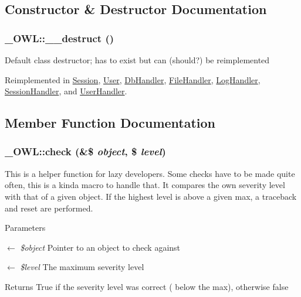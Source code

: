 \subsection{Constructor \& Destructor Documentation}
\subsubsection[{\_\-\_\-destruct}]{\setlength{\rightskip}{0pt plus 5cm}\_\-OWL::\_\-\_\-destruct ()}\label{class__OWL_a44fd2222476a3109286cc82d92b6bbcc}
Default class destructor; has to exist but can (should?) be reimplemented 

Reimplemented in \hyperlink{classSession_aa498272c85524e4700abc3363883165b}{Session}, \hyperlink{classUser_accd20149a7414612c1505e022eb63ffc}{User}, \hyperlink{classDbHandler_a7cd6bd727d1f296eb5dbfae6ca36ab3f}{DbHandler}, \hyperlink{classFileHandler_a734859e8962992da99dd8f853da5ae43}{FileHandler}, \hyperlink{classLogHandler_aacd0c653489cf221423b9edd62e81458}{LogHandler}, \hyperlink{classSessionHandler_a461097c3ee6b1aecf833ce1225d02329}{SessionHandler}, and \hyperlink{classUserHandler_a3e1f6381ed79caf6e1a255fb0a9cc386}{UserHandler}.



\subsection{Member Function Documentation}
\subsubsection[{check}]{\setlength{\rightskip}{0pt plus 5cm}\_\-OWL::check (\&\$ {\em object}, \/  \$ {\em level})}\label{class__OWL_ad6f4f6946f40199dd0333cf219fa500e}
This is a helper function for lazy developers. Some checks have to be made quite often, this is a kinda macro to handle that. It compares the own severity level with that of a given object. If the highest level is above a given max, a traceback and reset are performed.


\begin{DoxyParams}{Parameters}
\item[\mbox{$\leftarrow$} {\em \$object}]Pointer to an object to check against \item[\mbox{$\leftarrow$} {\em \$level}]The maximum severity level \end{DoxyParams}
\begin{DoxyReturn}{Returns}
True if the severity level was correct ( below the max), otherwise false 
\end{DoxyReturn}


